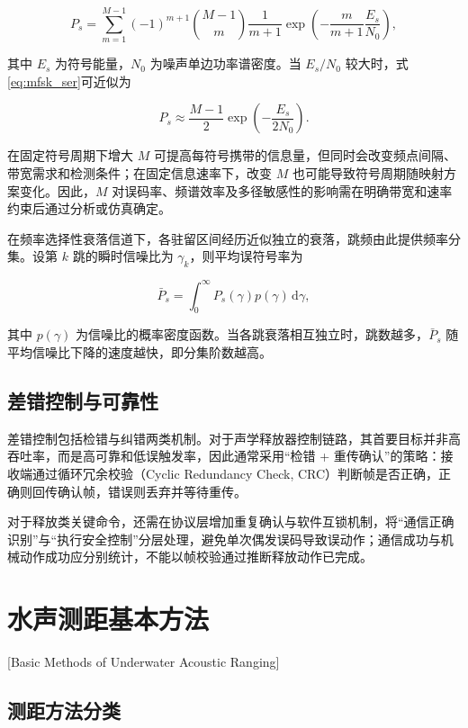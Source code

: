 \begin{equation}
  P_s = \sum_{m=1}^{M-1} (-1)^{m+1}\binom{M-1}{m}\frac{1}{m+1}\exp\left(-\frac{m}{m+1}\frac{E_s}{N_0}\right),
  \label{eq:mfsk_ser}
\end{equation}

其中 $E_s$ 为符号能量，$N_0$ 为噪声单边功率谱密度。当 $E_s/N_0$ 较大时，式\eqref{eq:mfsk_ser}可近似为

\begin{equation}
  P_s \approx \frac{M-1}{2}\exp\left(-\frac{E_s}{2N_0}\right).
  \label{eq:mfsk_ser_approx}
\end{equation}

在固定符号周期下增大 $M$ 可提高每符号携带的信息量，但同时会改变频点间隔、带宽需求和检测条件；在固定信息速率下，改变 $M$ 也可能导致符号周期随映射方案变化。因此，$M$ 对误码率、频谱效率及多径敏感性的影响需在明确带宽和速率约束后通过分析或仿真确定。

在频率选择性衰落信道下，各驻留区间经历近似独立的衰落，跳频由此提供频率分集。设第 $k$ 跳的瞬时信噪比为 $\gamma_k$，则平均误符号率为

\begin{equation}
  \bar{P}_s = \int_{0}^{\infty} P_s(\gamma) p(\gamma)\,\mathrm{d}\gamma,
  \label{eq:average_ser}
\end{equation}

其中 $p(\gamma)$ 为信噪比的概率密度函数。当各跳衰落相互独立时，跳数越多，$\bar{P}_s$ 随平均信噪比下降的速度越快，即分集阶数越高。

\subsection{差错控制与可靠性}

差错控制包括检错与纠错两类机制。对于声学释放器控制链路，其首要目标并非高吞吐率，而是高可靠和低误触发率，因此通常采用“检错 + 重传确认”的策略：接收端通过循环冗余校验（Cyclic Redundancy Check, CRC）判断帧是否正确，正确则回传确认帧，错误则丢弃并等待重传。

对于释放类关键命令，还需在协议层增加重复确认与软件互锁机制，将“通信正确识别”与“执行安全控制”分层处理，避免单次偶发误码导致误动作；通信成功与机械动作成功应分别统计，不能以帧校验通过推断释放动作已完成。

\section{水声测距基本方法}[Basic Methods of Underwater Acoustic Ranging]

\subsection{测距方法分类}

